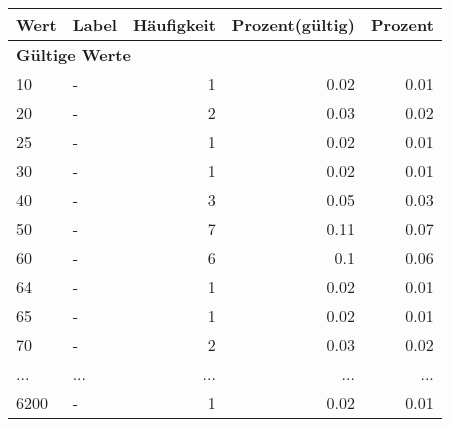      \begin{longtable}{lXrrr}
     \toprule
     \textbf{Wert} & \textbf{Label} & \textbf{Häufigkeit} & \textbf{Prozent(gültig)} & \textbf{Prozent} \\
     \endhead
     \midrule
     \multicolumn{5}{l}{\textbf{Gültige Werte}}\\
        10 & \multicolumn{1}{X}{-} & %
          \num{1} &
          \num[round-mode=places,round-precision=2]{0,02} &
          \num[round-mode=places,round-precision=2]{0,01} \\
        20 & \multicolumn{1}{X}{-} & %
          \num{2} &
          \num[round-mode=places,round-precision=2]{0,03} &
          \num[round-mode=places,round-precision=2]{0,02} \\
        25 & \multicolumn{1}{X}{-} & %
          \num{1} &
          \num[round-mode=places,round-precision=2]{0,02} &
          \num[round-mode=places,round-precision=2]{0,01} \\
        30 & \multicolumn{1}{X}{-} & %
          \num{1} &
          \num[round-mode=places,round-precision=2]{0,02} &
          \num[round-mode=places,round-precision=2]{0,01} \\
        40 & \multicolumn{1}{X}{-} & %
          \num{3} &
          \num[round-mode=places,round-precision=2]{0,05} &
          \num[round-mode=places,round-precision=2]{0,03} \\
        50 & \multicolumn{1}{X}{-} & %
          \num{7} &
          \num[round-mode=places,round-precision=2]{0,11} &
          \num[round-mode=places,round-precision=2]{0,07} \\
        60 & \multicolumn{1}{X}{-} & %
          \num{6} &
          \num[round-mode=places,round-precision=2]{0,1} &
          \num[round-mode=places,round-precision=2]{0,06} \\
        64 & \multicolumn{1}{X}{-} & %
          \num{1} &
          \num[round-mode=places,round-precision=2]{0,02} &
          \num[round-mode=places,round-precision=2]{0,01} \\
        65 & \multicolumn{1}{X}{-} & %
          \num{1} &
          \num[round-mode=places,round-precision=2]{0,02} &
          \num[round-mode=places,round-precision=2]{0,01} \\
        70 & \multicolumn{1}{X}{-} & %
          \num{2} &
          \num[round-mode=places,round-precision=2]{0,03} &
          \num[round-mode=places,round-precision=2]{0,02} \\
       ... & ... & ... & ... & ... \\
        6200 & \multicolumn{1}{X}{-} & %
          \num{1} &
          \num[round-mode=places,round-precision=2]{0,02} &
          \num[round-mode=places,round-precision=2]{0,01} \\


\end{longtable}
